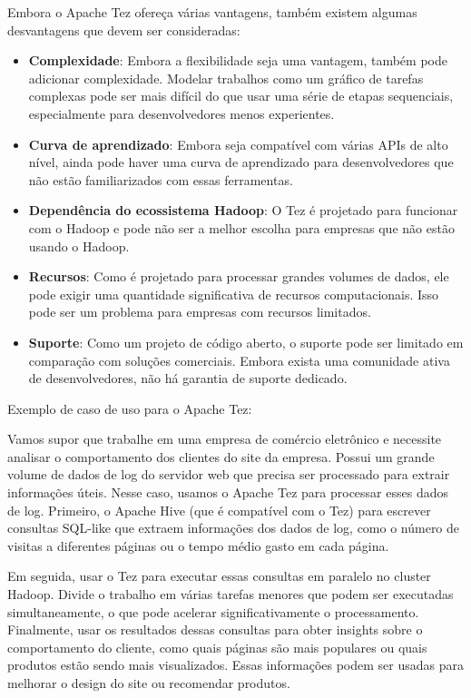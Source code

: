 \documentclass[a4paper,11pt]{article}
\begin{document}
Embora o Apache Tez ofereça várias vantagens, também existem algumas desvantagens que devem ser consideradas:
\begin{itemize}
 \item \textbf{Complexidade}: Embora a flexibilidade seja uma vantagem, também pode adicionar complexidade. Modelar trabalhos como um gráfico de tarefas complexas pode ser mais difícil do que usar uma série de etapas sequenciais, especialmente para desenvolvedores menos experientes.
 \item \textbf{Curva de aprendizado}: Embora seja compatível com várias APIs de alto nível, ainda pode haver uma curva de aprendizado para desenvolvedores que não estão familiarizados com essas ferramentas.
 \item \textbf{Dependência do ecossistema Hadoop}: O Tez é projetado para funcionar com o Hadoop e pode não ser a melhor escolha para empresas que não estão usando o Hadoop.
 \item \textbf{Recursos}: Como é projetado para processar grandes volumes de dados, ele pode exigir uma quantidade significativa de recursos computacionais. Isso pode ser um problema para empresas com recursos limitados.
 \item \textbf{Suporte}: Como um projeto de código aberto, o suporte pode ser limitado em comparação com soluções comerciais. Embora exista uma comunidade ativa de desenvolvedores, não há garantia de suporte dedicado.
\end{itemize}

Exemplo de caso de uso para o Apache Tez:

Vamos supor que trabalhe em uma empresa de comércio eletrônico e necessite analisar o comportamento dos clientes do site da empresa. Possui um grande volume de dados de log do servidor web que precisa ser processado para extrair informações úteis. Nesse caso, usamos o Apache Tez para processar esses dados de log. Primeiro, o Apache Hive (que é compatível com o Tez) para escrever consultas SQL-like que extraem informações dos dados de log, como o número de visitas a diferentes páginas ou o tempo médio gasto em cada página.

Em seguida, usar o Tez para executar essas consultas em paralelo no cluster Hadoop. Divide o trabalho em várias tarefas menores que podem ser executadas simultaneamente, o que pode acelerar significativamente o processamento. Finalmente, usar os resultados dessas consultas para obter insights sobre o comportamento do cliente, como quais páginas são mais populares ou quais produtos estão sendo mais visualizados. Essas informações podem ser usadas para melhorar o design do site ou recomendar produtos.
\end{document}
